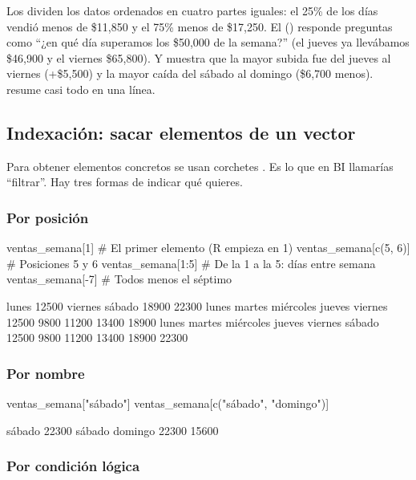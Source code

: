 Los  dividen los datos ordenados en cuatro partes
iguales: el 25\% de los días vendió menos de \$11,850 y el 75\% menos de
\$17,250. El  () responde preguntas como
``¿en qué día superamos los \$50,000 de la semana?'' (el jueves ya
llevábamos \$46,900 y el viernes \$65,800). Y  muestra que la
mayor subida fue del jueves al viernes (+\$5,500) y la mayor caída del
sábado al domingo (\$6,700 menos).  resume casi todo en
una línea.

\subsection{Indexación: sacar elementos de un vector}

Para obtener elementos concretos se usan corchetes \codigo{[ ]}. Es lo que
en BI llamarías ``filtrar''. Hay tres formas de indicar qué quieres.

\subsubsection{Por posición}

\begin{rcode}
ventas_semana[1]              # El primer elemento (R empieza en 1)
ventas_semana[c(5, 6)]        # Posiciones 5 y 6
ventas_semana[1:5]            # De la 1 a la 5: días entre semana
ventas_semana[-7]             # Todos menos el séptimo
\end{rcode}
\begin{rsalida}
lunes 
12500 
viernes  sábado 
  18900   22300 
    lunes    martes miércoles    jueves   viernes 
    12500      9800     11200     13400     18900 
    lunes    martes miércoles    jueves   viernes    sábado 
    12500      9800     11200     13400     18900     22300 
\end{rsalida}

\subsubsection{Por nombre}

\begin{rcode}
ventas_semana["sábado"]
ventas_semana[c("sábado", "domingo")]
\end{rcode}
\begin{rsalida}
sábado 
 22300 
 sábado domingo 
  22300   15600 
\end{rsalida}

\subsubsection{Por condición lógica}

